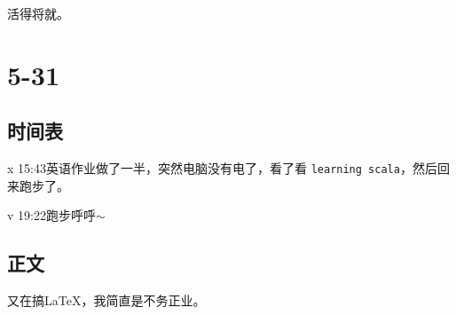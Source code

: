 \documentclass{peterlitsdoc}
\begin{document}
活得将就。


\section{5-31}

\subsection{时间表}

\begin{pltplan}
\item[x]{15:43}{英语作业}{做了一半，突然电脑没有电了，看了看
    \verb|learning scala|，然后回来跑步了。}
\item[v]{19:22}{跑步}{呼呼$\sim$}
\end{pltplan}

\subsection{正文}

又在搞\LaTeX{}，我简直是不务正业。
\end{document}
